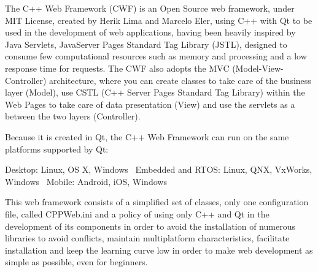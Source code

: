 The C++ Web Framework (C\+WF) is an Open Source web framework, under M\+IT License, created by Herik Lima and Marcelo Eler, using C++ with Qt to be used in the development of web applications, having been heavily inspired by Java Servlets, Java\+Server Pages Standard Tag Library (J\+S\+TL), designed to consume few computational resources such as memory and processing and a low response time for requests. The C\+WF also adopts the M\+VC (Model-\/\+View-\/\+Controller) architecture, where you can create classes to take care of the business layer (Model), use C\+S\+TL (C++ Server Pages Standard Tag Library) within the Web Pages to take care of data presentation (View) and use the servlets as a between the two layers (Controller).

Because it is created in Qt, the C++ Web Framework can run on the same platforms supported by Qt\+: ~\newline


Desktop\+: Linux, OS X, Windows~\newline
 Embedded and R\+T\+OS\+: Linux, Q\+NX, Vx\+Works, Windows~\newline
 Mobile\+: Android, i\+OS, Windows~\newline


This web framework consists of a simplified set of classes, only one configuration file, called C\+P\+P\+Web.\+ini and a policy of using only C++ and Qt in the development of its components in order to avoid the installation of numerous libraries to avoid conflicts, maintain multiplatform characteristics, facilitate installation and keep the learning curve low in order to make web development as simple as possible, even for beginners. 